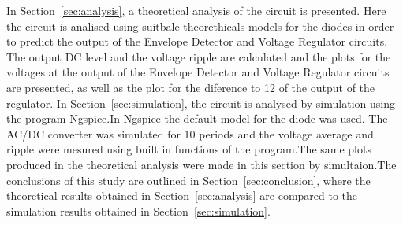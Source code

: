 In Section~\ref{sec:analysis}, a theoretical analysis of the circuit is
presented. Here the circuit is analised using suitbale theorethicals models for the diodes in order to predict the output of the Envelope Detector
and Voltage Regulator circuits. The output DC level and the
voltage ripple are calculated and the plots for the voltages at the output of the Envelope Detector and Voltage Regulator circuits are presented, as well as the plot for the diference to 12 of the output of the regulator. 
In Section~\ref{sec:simulation}, the circuit is analysed by
simulation using the program Ngspice.In Ngspice the default model for the diode was used. The AC/DC converter was simulated for 10 periods and the voltage average and ripple were mesured using built in functions of the program.The same plots produced in the theoretical analysis were made in this section by simultaion.The conclusions of this study are outlined in
Section~\ref{sec:conclusion}, where the theoretical results obtained in
Section~\ref{sec:analysis} are compared to the simulation results obtained in
Section~\ref{sec:simulation}.





\pagebreak

